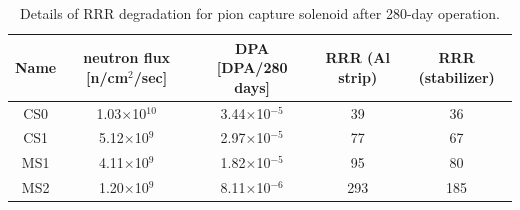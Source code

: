 \begin{table}[H]
 \centering
 \begin{tabular}{ccccc} \hline \hline
  Name & neutron flux [n/cm$^2$/sec] & DPA [DPA/280 days] & RRR (Al strip) & RRR (stabilizer) \\ \hline
  CS0 & 1.03$\times$10$^{10}$ & 3.44$\times$10$^{-5}$ & 39 & 36 \\
  CS1 & 5.12$\times$10$^{9}$ & 2.97$\times$10$^{-5}$ & 77 & 67 \\
  MS1 & 4.11$\times$10$^{9}$ & 1.82$\times$10$^{-5}$ & 95 & 80 \\
  MS2 & 1.20$\times$10$^{9}$ & 8.11$\times$10$^{-6}$ & 293 & 185 \\ \hline \hline
 \end{tabular}
 \caption{Details of RRR degradation for pion capture solenoid after 280-day operation.}
 \label{RRRdeg}
\end{table}

